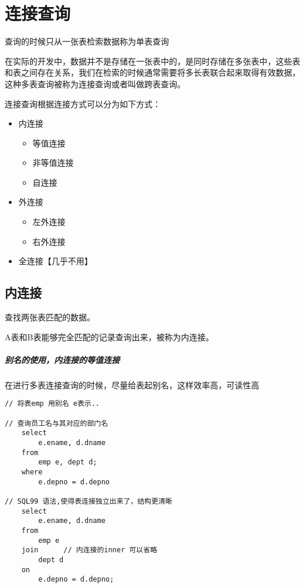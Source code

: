 \documentclass[UTF8,a4paper,12pt]{ctexbook}
\begin{document}
\section{连接查询}
			查询的时候只从一张表检索数据称为单表查询
			
			在实际的开发中，数据并不是存储在一张表中的，是同时存储在多张表中，这些表和表之间存在关系，我们在检索的时候通常需要将多长表联合起来取得有效数据，这种多表查询被称为连接查询或者叫做跨表查询。
			
			连接查询根据连接方式可以分为如下方式：
				\begin{itemize}[itemindent = 2em]
					\item  内连接
						\begin{itemize}[itemindent = 3em]
							\item 等值连接
							\item 非等值连接
							\item 自连接
						\end{itemize}
						
					\item  外连接
						\begin{itemize}[itemindent = 3em]
							\item 左外连接
							\item 右外连接
						\end{itemize}
						
					\item  全连接【几乎不用】
				\end{itemize}
				
		\subsection{内连接}		
				查找两张表匹配的数据。
				
				A表和B表能够完全匹配的记录查询出来，被称为内连接。
				
				\subparagraph{别名的使用，内连接的等值连接} 在进行多表连接查询的时候，尽量给表起别名，这样效率高，可读性高
					\begin{lstlisting}
// 将表emp 用别名 e表示..	

// 查询员工名与其对应的部门名
	select	
		e.ename, d.dname
	from 
		emp e, dept d;
	where 
		e.depno = d.depno
		
// SQL99 语法,使得表连接独立出来了，结构更清晰
	select 
		e.ename, d.dname
	from 
		emp e
	join	  // 内连接的inner 可以省略 
	    dept d
	on 
		e.depno = d.depno;
					\end{lstlisting}
					
\end{document}

